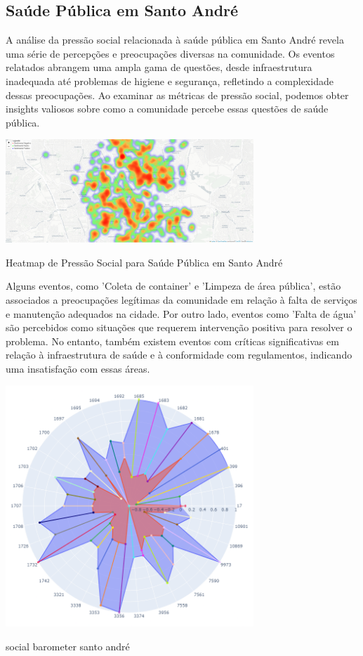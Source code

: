 \subsection{Saúde Pública em Santo André}

A análise da pressão social relacionada à saúde pública em Santo André revela uma série de percepções e preocupações diversas na comunidade. Os eventos relatados abrangem uma ampla gama de questões, desde infraestrutura inadequada até problemas de higiene e segurança, refletindo a complexidade dessas preocupações. Ao examinar as métricas de pressão social, podemos obter insights valiosos sobre como a comunidade percebe essas questões de saúde pública.

\begin{quadro}[htb]
	\centering
	\includegraphics[width=0.7\textwidth]{images/heatmap_santo_andre.PNG}
	\caption{Heatmap de Pressão Social para Saúde Pública em Santo André}
	\label{fig:heatmap_santo_andre}
\end{quadro}

Alguns eventos, como 'Coleta de container' e 'Limpeza de área pública', estão associados a preocupações legítimas da comunidade em relação à falta de serviços e manutenção adequados na cidade. Por outro lado, eventos como 'Falta de água' são percebidos como situações que requerem intervenção positiva para resolver o problema. No entanto, também existem eventos com críticas significativas em relação à infraestrutura de saúde e à conformidade com regulamentos, indicando uma insatisfação com essas áreas.

\begin{quadro}[htb]
	\centering
	\includegraphics[width=0.7\textwidth]{images/social_barometer_santo_andre.png}
	\caption{social barometer santo andré}
	\label{fig:social_barometer_santo_andre}
\end{quadro}

